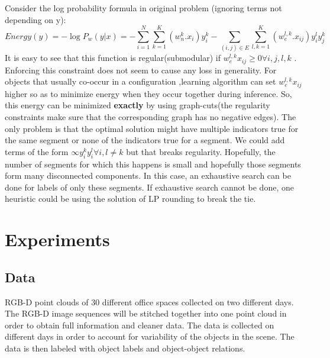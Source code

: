 \documentclass[11pt]{article} %
\begin{document}
Consider the log probability formula in original problem (ignoring terms not depending on y):
\begin{equation}
Energy(y)= -\log P_w (y|x) = -\sum_{i=1}^{N} \sum_{k=1}^{K} (w^{k}_{n}.x_{i})y_{i}^{k} - \sum_{(i,j)\in E} \sum_{l,k=1}^{K} (w_{e}^{l,k}.x_{ij})y_i^l y_j^k
\end{equation}
It is easy to see that this function is regular(submodular) if $w_e^{l,k}x_{ij} \ge 0 \forall i,j,l,k$ . Enforcing this constraint does not seem to cause any loss in generality. For objects that usually co-occur in a configuration ,learning algorithm can set $w_e^{l,k}x_{ij}$ higher so as to minimize energy when they occur together during inference. So, this energy can be minimized {\bf exactly} by using graph-cuts(the regularity constraints make sure that the corresponding graph has no negative edges). The only problem is that the optimal solution might have multiple indicators true for the same segment or none of the indicators true for a segment. We could add terms of the form $\infty y_i^ky_i^l \forall i, l\neq k$ but that breaks regularity.
Hopefully, the number of segments for which this happens is small and hopefully those segments form many disconnected components. In this case, an exhaustive search can be done for labels of only these segments.
If exhaustive search cannot be done, one heuristic could  be using the solution of LP rounding  to break the tie.


     
   \section{Experiments}
   \subsection{Data}
     RGB-D point clouds of 30 different office spaces collected on two different days. The RGB-D image sequences will be stitched together
     into one point cloud in order to obtain full information and cleaner data. The data is collected on different days in order to account for 
     variability of the objects in the scene. The data is then labeled with object labels and object-object relations.

 
 \small
\end{document}
